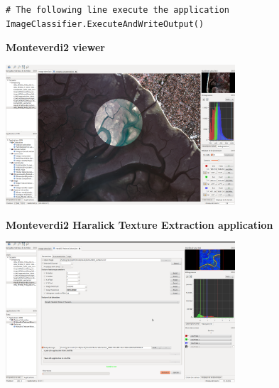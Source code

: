 \documentclass[portrait,a0]{a0poster}
\newenvironment{poster}{
  \begin{center}
  \begin{minipage}[c]{0.99\textwidth}
}{
  \end{minipage} 
  \end{center}
}
\newcommand{\titresubsection}[1]{ 
 	\begin{center}
 	\Large{\textbf{#1}}
 	\end{center}
 }
\begin{document}
\begin{poster}
\begin{minipage}[t]{\textwidth}
\begin{minipage}[t]{0.33\textwidth}
\begin{minipage}[t]{\textwidth}
\begin{lstlisting}
# The following line execute the application
ImageClassifier.ExecuteAndWriteOutput()
\end{lstlisting}
\end{minipage}
\end{minipage}
\hfill
\begin{minipage}[t]{0.33\textwidth}
\begin{minipage}[t]{\textwidth}
\titresubsection{Monteverdi2 viewer}
\begin{center}
\includegraphics[width=0.64\textwidth]{Pictures/monteverdi2-loupe.png}
\end{center}
\end{minipage}
\vspace{0.5cm}

\begin{minipage}[t]{\textwidth}
\titresubsection{Monteverdi2 Haralick Texture Extraction application}
\begin{center}
\includegraphics[width=0.64\textwidth]{Pictures/monteverdi2-haralick.png}
\end{center}
\end{minipage}
\vspace{0.5cm}


\end{minipage}
\end{minipage}
\end{poster}
\end{document}
